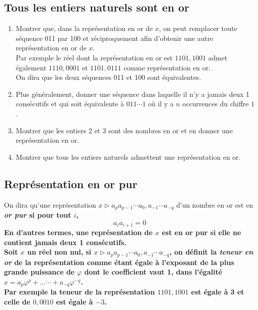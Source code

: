 \documentclass[landscape,twocolumn,leqno,a4paper,10pt]{report} %
\newcommand\n{\noindent}
\renewcommand{\textbf}[1]{\begingroup\bfseries\mathversion{bold}#1\endgroup}		%
\begin{document}
\subsection{Tous les entiers naturels sont en or}


\begin{enumerate}
	\item Montrer que, dans la représentation en or de $x$, on peut remplacer toute séquence 011 par 100 et réciproquement afin d'obtenir une autre représentation en or de $x$.\\
	Par exemple le réel dont la représentation en or est $1101,1001$ admet également $1110,0001$ et $1101,0111$ comme représentation en or.\\
	On dira que les deux séquences 011 et 100 sont équivalentes.
	\item Plus généralement, donner une séquence dans laquelle il n'y a jamais deux 1 consécutifs et qui soit équivalente à $011 \cdots 1$ où il y a $n$ occurrences du chiffre $1$.
	\item Montrer que les entiers 2 et 3 sont des nombres en or et en donner une représentation en or.
	\item Montrer que tous les entiers naturels admettent une représentation en or.
\end{enumerate}


\subsection{Représentation en or pur}

\n On dira qu'une représentation $x \triangleright a_{p} a_{p-1} \cdots a_{0}, a_{-1} \cdots a_{-q}$ d'un nombre en or est en \textbf{\textit{or pur}} si pour tout $i$,
$$a_{i} a_{i+1}=0$$
En d'autres termes, une représentation de $x$ est en or pur si elle ne contient jamais deux 1 consécutifs.\\

\n Soit $x$ un réel non nul, si $x \triangleright a_{p} a_{p-1} \cdots a_{0}, a_{-1} \cdots a_{-q}$, on définit la \textbf{\textit{teneur en or}} de la représentation comme étant égale à l'exposant de la plus grande puissance de $\varphi$ dont le coefficient vaut 1, dans l'égalité $x=a_{p} \varphi^{p}+\ldots \cdots+a_{-q} \varphi^{-q}$.\\
Par exemple la teneur de la représentation $1101,1001$ est égale à 3 et celle de $0,0010$ est égale à $-3$.
\end{document}
